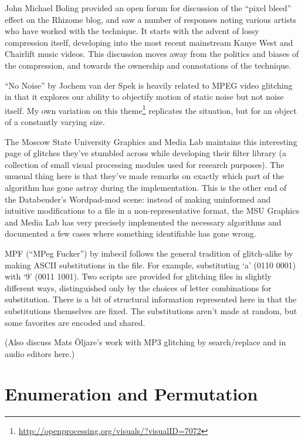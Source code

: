 \documentclass{thesis}
\begin{document}
	John Michael Boling provided an open forum for discussion of the ``pixel bleed'' effect on the Rhizome blog\cite{john_michael_boling_rhizome_????}, and saw a number of responses noting various artists who have worked with the technique. It starts with the advent of lossy compression itself, developing into the most recent mainstream Kanye West and Chairlift music videos. This discussion moves away from the politics and biases of the compression, and towards the ownership and connotations of the technique.
	
	``No Noise'' by Jochem van der Spek\cite{jochem_van_der_spek_no_2001} is heavily related to MPEG video glitching in that it explores our ability to objectify motion of static noise but not noise itself. My own variation on this theme\footnote{\url{http://openprocessing.org/visuals/?visualID=7072}} replicates the situation, but for an object of a constantly varying size.
	
	The Moscow State University Graphics and Media Lab maintains this interesting page of glitches\cite{nikolai_trunichkin_and_dr._dmitriy_vatolin_crazy_????} they've stumbled across while developing their filter library (a collection of small visual processing modules used for research purposes). The unusual thing here is that they've made remarks on exactly which part of the algorithm has gone astray during the implementation. This is the other end of the Databender's Wordpad-mod scene: instead of making uninformed and intuitive modifications to a file in a non-representative format, the MSU Graphics and Media Lab has very precisely implemented the necessary algorithms and documented a few cases where something identifiable has gone wrong.
	
	MPF (``MPeg Fucker'') by imbecil\cite{imbecil_mpeg_2004} follows the general tradition of glitch-alike by making ASCII substitutions in the file. For example, substituting `a' (0110 0001) with `9' (0011 1001). Two scripts are provided for glitching files in slightly different ways, distinguished only by the choices of letter combinations for substitution. There is a bit of structural information represented here in that the substitutions themselves are fixed. The substitutions aren't made at random, but some favorites are encoded and shared.
	
	(Also discuss Mats \"Oljare's work with MP3 glitching by search/replace and in audio editors here.)
	
\section{Enumeration and Permutation}
	
\end{document}
